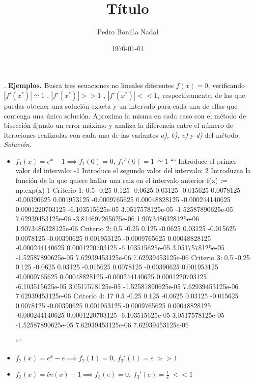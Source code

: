 \documentclass[11pt,a4paper]{article}
\title{Título}
\author{Pedro Bonilla Nadal}
\date{\today}
\begin{document}
. \textbf{Ejemplos.} Busca tres ecuaciones no lineales diferentes $f (x) = 0$, verificando $ |f'(x^* )| \simeq 1$ , $ |f'(x^*)| >> 1$ , $ |f'(x^* )| << 1,$ respectivamente, de las que puedas obtener una solución exacta y un intervalo para cada una de ellas que contenga una única solución. Aproxima la misma en cada caso con el método de bisección fijando un error máximo y analiza la diferencia entre el número de iteraciones realizadas con cada una de las variantes \emph{a), b), c)} y \emph{d) }del método.\\

\emph{Solución.}
\begin{itemize}
	\item $f_1(x) = e^x-1 \implies f_1(0) = 0,\ f_1'(0)=1\ \simeq 1$
        ```
        Introduce el primer valor del intervalo: -1
        Introduce el segundo valor del intervalo: 2
        Introduzca la función de la que quiere hallar una raiz en el intervalo anterior
        f(x) := np.exp(x)-1
        Criterio 1:
        0.5
        -0.25
        0.125
        -0.0625
        0.03125
        -0.015625
        0.0078125
        -0.00390625
        0.001953125
        -0.0009765625
        0.00048828125
        -0.000244140625
        0.0001220703125
        -6.103515625e-05
        3.0517578125e-05
        -1.52587890625e-05
        7.62939453125e-06
        -3.814697265625e-06
        1.9073486328125e-06
        1.9073486328125e-06
        Criterio 2:
        0.5
        -0.25
        0.125
        -0.0625
        0.03125
        -0.015625
        0.0078125
        -0.00390625
        0.001953125
        -0.0009765625
        0.00048828125
        -0.000244140625
        0.0001220703125
        -6.103515625e-05
        3.0517578125e-05
        -1.52587890625e-05
        7.62939453125e-06
        7.62939453125e-06
        Criterio 3:
        0.5
        -0.25
        0.125
        -0.0625
        0.03125
        -0.015625
        0.0078125
        -0.00390625
        0.001953125
        -0.0009765625
        0.00048828125
        -0.000244140625
        0.0001220703125
        -6.103515625e-05
        3.0517578125e-05
        -1.52587890625e-05
        7.62939453125e-06
        7.62939453125e-06
        Criterio 4:
        17
        0.5
        -0.25
        0.125
        -0.0625
        0.03125
        -0.015625
        0.0078125
        -0.00390625
        0.001953125
        -0.0009765625
        0.00048828125
        -0.000244140625
        0.0001220703125
        -6.103515625e-05
        3.0517578125e-05
        -1.52587890625e-05
        7.62939453125e-06
        7.62939453125e-06

        ```
	\item $f_2(x) = e^x-e \implies f_2(1) = 0,\ f_2'(1)=e\ >> 1$
	\item $f_3(x) = ln(x)-1 \implies f_3(e) = 0,\ f_3'(e)=\frac{1}{e}\ << 1$
\end{itemize}
\end{document}

